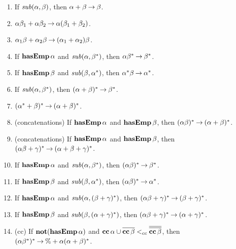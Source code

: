 \begin{enumerate}[\quad(1)]
\item If ${\it sub}(\alpha,\beta)$, then $\alpha + \beta \mathbin{\to} \beta$.

\item $\alpha\beta_1 + \alpha\beta_2 \mathbin{\to} \alpha(\beta_1+\beta_2)$.

\item $\alpha_1\beta + \alpha_2\beta \mathbin{\to} (\alpha_1+\alpha_2)\beta$.

\item If $\mathbf{hasEmp}\,\alpha$ and ${\it sub}(\alpha,\beta^*)$, then
  $\alpha\beta^* \mathbin{\to} \beta^*$.

\item If $\mathbf{hasEmp}\,\beta$ and ${\it sub}(\beta,\alpha^*)$, then
  $\alpha^*\beta \mathbin{\to} \alpha^*$.

\item If ${\it sub}(\alpha,\beta^*)$, then $(\alpha+\beta)^* \mathbin{\to} \beta^*$.

\item $(\alpha^* + \beta)^* \mathbin{\to} (\alpha+\beta)^*$.

\item (concatenations) If $\mathbf{hasEmp}\,\alpha$ and $\mathbf{hasEmp}\,\beta$, then
  $(\alpha\beta)^* \mathbin{\to} (\alpha+\beta)^*$.

\item (concatenations) If $\mathbf{hasEmp}\,\alpha$ and $\mathbf{hasEmp}\,\beta$, then
  $(\alpha\beta + \gamma)^* \mathbin{\to} (\alpha+\beta+\gamma)^*$.
 
\item If $\mathbf{hasEmp}\,\alpha$ and ${\it sub}(\alpha,\beta^*)$, then
  $(\alpha\beta)^* \mathbin{\to} \beta^*$.

\item If $\mathbf{hasEmp}\,\beta$ and ${\it sub}(\beta,\alpha^*)$, then
  $(\alpha\beta)^* \mathbin{\to} \alpha^*$.

\item If $\mathbf{hasEmp}\,\alpha$ and ${\it sub}(\alpha,(\beta + \gamma)^*)$, then
  $(\alpha\beta + \gamma)^* \mathbin{\to} (\beta + \gamma)^*$.

\item If $\mathbf{hasEmp}\,\beta$ and ${\it sub}(\beta,(\alpha + \gamma)^*)$, then
  $(\alpha\beta + \gamma)^* \mathbin{\to} (\alpha + \gamma)^*$.

\item (cc) If $\mathbf{not}(\mathbf{hasEmp}\,\alpha)$ and $\mathbf{cc}\,\alpha \cup
  \overline{\mathbf{cc}\,\beta} \mathrel{<_{cc}} \overline{\overline{\mathbf{cc}\,\beta}}$, then
  $(\alpha\beta^*)^* \mathbin{\to} \% + \alpha(\alpha+\beta)^*$.


\end{enumerate}
